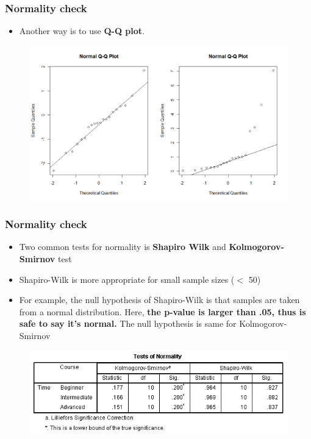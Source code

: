 \documentclass{beamer}
\begin{document}
\begin{frame}
	\frametitle{Normality check} 
	\begin{itemize}
		\item Another way is to use \textbf{Q-Q plot}.  %
	\end{itemize}
	\begin{figure}
		\includegraphics[width=0.8\linewidth]{qqplot}
	\end{figure}
\end{frame}

\begin{frame}
	\frametitle{Normality check} 
	\begin{itemize}
		\item Two common tests for normality is \textbf{Shapiro Wilk} and \textbf{Kolmogorov-Smirnov} test %
		\item Shapiro-Wilk is more appropriate for small sample sizes ($<$ 50)
		\item For example, the null hypothesis of Shapiro-Wilk is that samples are taken from a normal distribution.  Here, \textbf{the p-value is larger than .05, thus is safe to say it's normal.}   The null hypothesis is same for Kolmogorov-Smirnov 
	\end{itemize}
	\begin{figure}
		\includegraphics[width=0.8\linewidth]{normality}
	\end{figure}
\end{frame}
\end{document}

